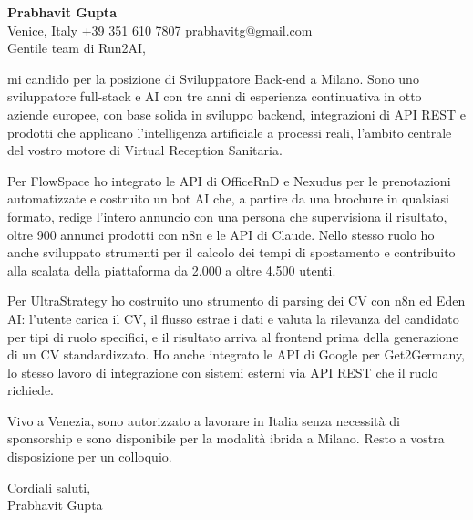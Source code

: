 \documentclass[a4paper,10.5pt]{article}
\begin{document}
\textbf{Prabhavit Gupta}\\
Venice, Italy \textbar{} +39 351 610 7807 \textbar{} prabhavitg@gmail.com\\[10pt]
Gentile team di Run2AI,

mi candido per la posizione di Sviluppatore Back-end a Milano. Sono uno sviluppatore full-stack e AI con tre anni di esperienza continuativa in otto aziende europee, con base solida in sviluppo backend, integrazioni di API REST e prodotti che applicano l'intelligenza artificiale a processi reali, l'ambito centrale del vostro motore di Virtual Reception Sanitaria.

Per FlowSpace ho integrato le API di OfficeRnD e Nexudus per le prenotazioni automatizzate e costruito un bot AI che, a partire da una brochure in qualsiasi formato, redige l'intero annuncio con una persona che supervisiona il risultato, oltre 900 annunci prodotti con n8n e le API di Claude. Nello stesso ruolo ho anche sviluppato strumenti per il calcolo dei tempi di spostamento e contribuito alla scalata della piattaforma da 2.000 a oltre 4.500 utenti.

Per UltraStrategy ho costruito uno strumento di parsing dei CV con n8n ed Eden AI: l'utente carica il CV, il flusso estrae i dati e valuta la rilevanza del candidato per tipi di ruolo specifici, e il risultato arriva al frontend prima della generazione di un CV standardizzato. Ho anche integrato le API di Google per Get2Germany, lo stesso lavoro di integrazione con sistemi esterni via API REST che il ruolo richiede.

Vivo a Venezia, sono autorizzato a lavorare in Italia senza necessità di sponsorship e sono disponibile per la modalità ibrida a Milano. Resto a vostra disposizione per un colloquio.

Cordiali saluti,\\
Prabhavit Gupta
\end{document}
